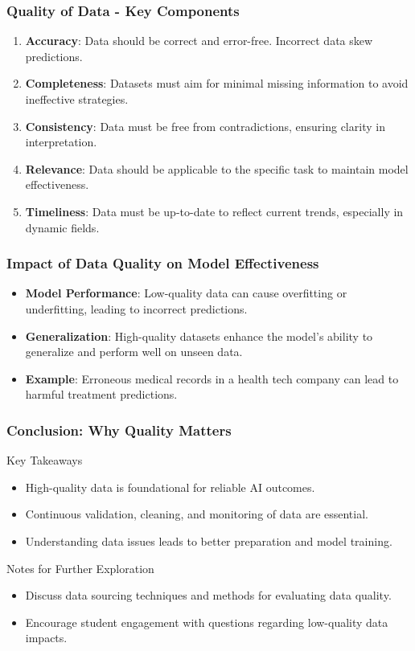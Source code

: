 \documentclass[aspectratio=169]{beamer}
\begin{document}
\begin{frame}[fragile]
    \frametitle{Quality of Data - Key Components}
    \begin{enumerate}
        \item \textbf{Accuracy}: Data should be correct and error-free. Incorrect data skew predictions.
        \item \textbf{Completeness}: Datasets must aim for minimal missing information to avoid ineffective strategies.
        \item \textbf{Consistency}: Data must be free from contradictions, ensuring clarity in interpretation.
        \item \textbf{Relevance}: Data should be applicable to the specific task to maintain model effectiveness.
        \item \textbf{Timeliness}: Data must be up-to-date to reflect current trends, especially in dynamic fields.
    \end{enumerate}
\end{frame}

\begin{frame}[fragile]
    \frametitle{Impact of Data Quality on Model Effectiveness}
    \begin{itemize}
        \item \textbf{Model Performance}: Low-quality data can cause overfitting or underfitting, leading to incorrect predictions.
        \item \textbf{Generalization}: High-quality datasets enhance the model's ability to generalize and perform well on unseen data.
        \item \textbf{Example}: Erroneous medical records in a health tech company can lead to harmful treatment predictions.
    \end{itemize}
\end{frame}

\begin{frame}[fragile]
    \frametitle{Conclusion: Why Quality Matters}
    \begin{block}{Key Takeaways}
        \begin{itemize}
            \item High-quality data is foundational for reliable AI outcomes.
            \item Continuous validation, cleaning, and monitoring of data are essential.
            \item Understanding data issues leads to better preparation and model training.
        \end{itemize}
    \end{block}
    \begin{block}{Notes for Further Exploration}
        \begin{itemize}
            \item Discuss data sourcing techniques and methods for evaluating data quality.
            \item Encourage student engagement with questions regarding low-quality data impacts.
        \end{itemize}
    \end{block}
\end{frame}
\end{document}

